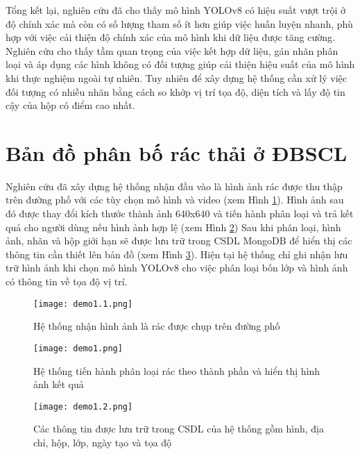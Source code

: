 \documentclass[../the.tex]{subfiles}
\begin{document}
\bigskip
{\fontsize{13}{12} \selectfont

    Tổng kết lại, nghiên cứu đã cho thấy mô hình YOLOv8 có hiệu suất vượt trội ở độ chính xác
    mà còn có số lượng tham số ít hơn giúp việc huấn luyện nhanh, phù hợp với việc cải thiện độ chính xác của mô hình khi dữ liệu được tăng cường.
    Nghiên cứu cho thấy tầm quan trọng của việc kết hợp dữ liệu, gán nhãn phân loại và áp dụng các hình không có đối tượng giúp cải thiện hiệu suất của mô hình khi thực nghiệm ngoài tự nhiên.
    Tuy nhiên để xây dựng hệ thống cần xử lý việc đối tượng có nhiều nhãn bằng cách so khớp vị trí tọa độ, diện tích và lấy độ tin cậy của hộp có điểm cao nhất.
}

\section{Bản đồ phân bố rác thải ở ĐBSCL}
{\fontsize{13}{12} \selectfont 

Nghiên cứu đã xây dựng hệ thống nhận đầu vào là hình ảnh rác được thu thập trên đường phố với các tùy chọn mô hình và video (xem Hình \ref{fig:demo1.1}). 
Hình ảnh sau đó được thay đổi kích thước thành ảnh 640x640 và tiến hành phân loại và trả kết quả cho người dùng nếu hình ảnh hợp lệ (xem Hình \ref{fig:demo1})
Sau khi phân loại, hình ảnh, nhãn và hộp giới hạn sẽ được lưu trữ trong CSDL MongoDB để hiển thị các thông tin cần thiết lên bản đồ (xem Hình \ref{fig:demo1.2}).
Hiện tại hệ thống chỉ ghi nhận lưu trữ hình ảnh khi chọn mô hình YOLOv8 cho việc phân loại bốn lớp và hình ảnh có thông tin về tọa độ vị trí.

}

\begin{figure}[H]
    \centering
    \texttt{[image: demo1.1.png]}
    \caption{Hệ thống nhận hình ảnh là rác được chụp trên đường phố}
    \label{fig:demo1.1}
\end{figure}

\begin{figure}[H]
    \centering
    \texttt{[image: demo1.png]}
    \caption{Hệ thống tiến hành phân loại rác theo thành phần và hiển thị hình ảnh kết quả}
    \label{fig:demo1}
\end{figure}

\begin{figure}[H]
    \centering
    \texttt{[image: demo1.2.png]}
    \caption{Các thông tin được lưu trữ trong CSDL của hệ thống gồm hình, địa chỉ, hộp, lớp, ngày tạo và tọa độ}
    \label{fig:demo1.2}
\end{figure}
\end{document}
